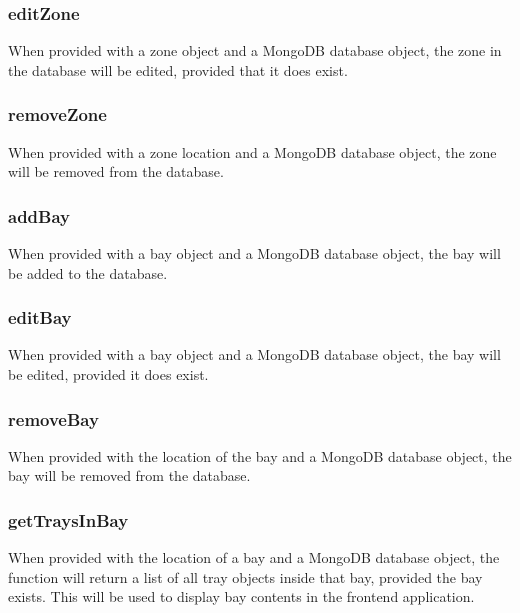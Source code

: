 \documentclass[letterpaper,10pt,english]{sphinxmanual}
\begin{document}
\subsubsection{editZone}
\label{\detokenize{docs/System_Overview/Backend_overview:editzone}}
When provided with a zone object and a MongoDB database object, the zone
in the database will be edited, provided that it does exist.


\subsubsection{removeZone}
\label{\detokenize{docs/System_Overview/Backend_overview:removezone}}
When provided with a zone location and a MongoDB database object, the
zone will be removed from the database.


\subsubsection{addBay}
\label{\detokenize{docs/System_Overview/Backend_overview:addbay}}
When provided with a bay object and a MongoDB database object, the bay
will be added to the database.


\subsubsection{editBay}
\label{\detokenize{docs/System_Overview/Backend_overview:editbay}}
When provided with a bay object and a MongoDB database object, the bay
will be edited, provided it does exist.


\subsubsection{removeBay}
\label{\detokenize{docs/System_Overview/Backend_overview:removebay}}
When provided with the location of the bay and a MongoDB database
object, the bay will be removed from the database.


\subsubsection{getTraysInBay}
\label{\detokenize{docs/System_Overview/Backend_overview:gettraysinbay}}
When provided with the location of a bay and a MongoDB database object,
the function will return a list of all tray objects inside that bay,
provided the bay exists. This will be used to display bay contents in
the front\sphinxhyphen{}end application.
\end{document}
